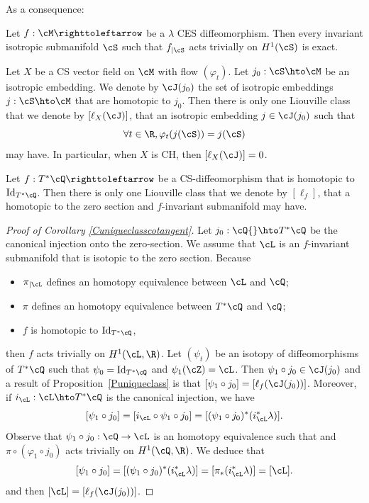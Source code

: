 As a consequence:

\begin{proposition} \label{Pinvalagrexact}
Let $f:\cM \righttoleftarrow$ be a $\lambda$ CES diffeomorphism. Then every invariant isotropic submanifold { $\cS$ such that $f_{|\cS}$ acts trivially on $H^1(\cS)$} is exact.
\end{proposition}

\begin{corollary}\label{Cuniqueclassflow}
Let $X$ be a CS vector field on $\cM$ with flow $(\varphi_t)$. Let $ j_0:\cS\hto\cM$ be an isotropic embedding. We denote by $\cJ(j_0)$ the set of isotropic embeddings $ j:\cS\hto\cM$ that are homotopic to $j_0$. Then there is only one Liouville class that we denote by $[\ell_X(\cJ)]$, that an isotropic embedding $j\in\cJ(j_0)$ such that
\[
\forall t\in\R, \varphi_t(j(\cS))=j(\cS)
\]
may have.
In particular, when $X$ is CH, then $[\ell_X(\cJ)]=0$.
\end{corollary}

\begin{corollary}\label{Cuniqueclasscotangent}
Let $f: T^*\cQ \righttoleftarrow$ be a CS-diffeomorphism that is homotopic to ${\rm Id}_{T^*\cQ}$. Then there is only one Liouville class that we denote by $[\ell_f]$, that a homotopic to the zero section and $f$-invariant submanifold may have.
\end{corollary}

\begin{proof}[Proof of Corollary \ref{Cuniqueclasscotangent}] Let $j_0: \cQ{}\hto T^*\cQ$ be the canonical injection onto the zero-section.
We assume that $\cL$ is an $f$-invariant submanifold that is isotopic to the zero section.
Because
\begin{itemize}
\item
$\pi_{|\cL}$ defines an homotopy equivalence between $\cL$ and $\cQ$;
\item
$\pi$ defines an homotopy equivalence between $T^*\cQ$ and $\cQ$;
\item
$f$ is homotopic to ${\rm Id}_{T^*\cQ}$,
\end{itemize}
then $f$ acts trivially on $H^1(\cL,\R)$.
Let $(\psi_t)$ be an isotopy of diffeomorphisms of $T^*\cQ$ such that $\psi_0={\rm Id}_{T^*\cQ}$ and $\psi_1(\cZ)=\cL$. Then $\psi_1\circ j_0\in \cJ(j_0)$ and
a result of Proposition~\ref{Puniqueclass} is that $[\psi_1\circ j_0]=[\ell_f(\cJ(j_0))]$.
Moreover, if $i_\cL:\cL\hto T^*\cQ$ is the canonical injection, we have
\[
[\psi_1\circ j_0]=[i_\cL\circ\psi_1\circ j_0]=[(\psi_1\circ j_0)^*(i_\cL^*\lambda)].
\]
Observe that $\psi_1\circ j_0:\cQ\to \cL$ is an homotopy equivalence such that and $\pi\circ (\varphi_1\circ j_0)$ acts trivially on $H^1(\cQ, \R)$. We deduce that
\[
[\psi_1\circ j_0]=[(\psi_1\circ j_0)^*(i_\cL^*\lambda)]=[\pi_*(i_\cL^*\lambda)]=[\cL].
\]
and then $[\cL]=[\ell_f(\cJ(j_0))]$.
\end{proof}
